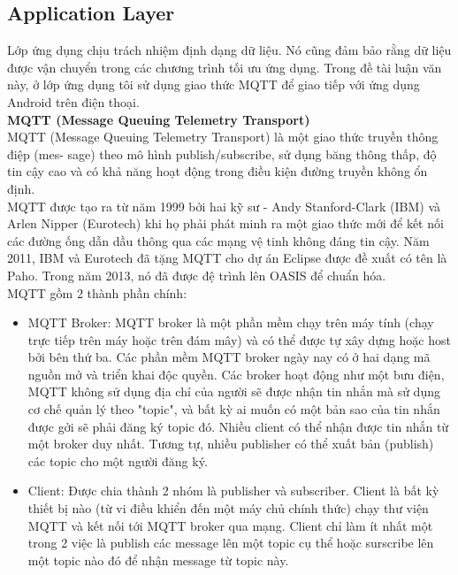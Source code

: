 \documentclass{report}
\begin{document}
\subsection{Application Layer}
Lớp ứng dụng chịu trách nhiệm định dạng dữ liệu. Nó cũng đảm bảo rằng dữ liệu được vận
chuyển trong các chương trình tối ưu ứng dụng. Trong đề tài luận văn này, ở lớp ứng dụng tôi sử dụng giao thức MQTT để giao tiếp với ứng dụng Android trên điện thoại. \\

\textbf{MQTT (Message Queuing Telemetry Transport)} \\

MQTT (Message Queuing Telemetry Transport) là một giao thức truyền thông điệp (mes-
sage) theo mô hình publish/subscribe, sử dụng băng thông thấp, độ tin cậy cao và có khả năng
hoạt động trong điều kiện đường truyền không ổn định. \\

MQTT được tạo ra từ năm 1999 bởi hai kỹ sư - Andy Stanford-Clark (IBM) và Arlen Nipper
(Eurotech) khi họ phải phát minh ra một giao thức mới để kết nối các đường ống dẫn dầu thông qua
các mạng vệ tinh không đáng tin cậy. Năm 2011, IBM và Eurotech đã tặng MQTT cho dự án
Eclipse được đề xuất có tên là Paho. Trong năm 2013, nó đã được đệ trình lên OASIS để chuẩn
hóa. \\

MQTT gồm 2 thành phần chính: 
\begin{itemize}
\item MQTT Broker: MQTT broker là một phần mềm chạy trên máy tính (chạy trực tiếp trên máy hoặc trên đám mây) và có thể được tự xây dựng hoặc host bởi bên thứ ba. Các phần mềm MQTT broker ngày nay có ở hai dạng mã nguồn mở và triển khai độc quyền. Các broker hoạt động như một bưu điện, MQTT không sử dụng địa chỉ của người sẽ được nhận tin nhắn mà sử dụng cơ chế quản lý theo "topic", và bất kỳ ai muốn có một bản sao của tin nhắn được gởi sẽ phải đăng ký topic đó. Nhiều client có thể nhận được tin nhắn từ một broker duy nhất. Tương tự, nhiều publisher có thể xuất bản (publish) các topic cho một người đăng ký.
\item Client: Được chia thành 2 nhóm là publisher và subscriber. Client là bất kỳ thiết bị nào (từ vi điều khiển đến một máy chủ chính thức) chạy thư viện MQTT và kết nối tới MQTT broker qua mạng. Client chỉ làm ít nhất một trong 2 việc là publish các message lên một topic cụ thể hoặc surscribe lên một topic nào đó để nhận message từ topic này.
\end{itemize}
\end{document}
